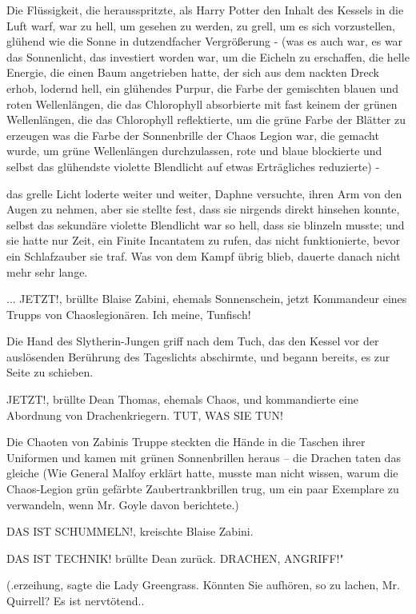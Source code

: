 Die Flüssigkeit, die herausspritzte, als Harry Potter den Inhalt des Kessels in
die Luft warf, war zu hell, um gesehen zu werden, zu grell, um es sich
vorzustellen, glühend wie die Sonne in dutzendfacher Vergrößerung - (was es auch
war, es war das Sonnenlicht, das investiert worden war, um die Eicheln zu
erschaffen, die helle Energie, die einen Baum angetrieben hatte, der sich aus
dem nackten Dreck erhob, lodernd hell, ein glühendes Purpur, die Farbe der
gemischten blauen und roten Wellenlängen, die das Chlorophyll absorbierte mit
fast keinem der grünen Wellenlängen, die das Chlorophyll reflektierte, um die
grüne Farbe der Blätter zu erzeugen was die Farbe der Sonnenbrille der Chaos
Legion war, die gemacht wurde, um grüne Wellenlängen durchzulassen, rote und
blaue blockierte und selbst das glühendste violette Blendlicht auf etwas
Erträgliches reduzierte) -

das grelle Licht loderte weiter und weiter, Daphne versuchte, ihren Arm von den
Augen zu nehmen, aber sie stellte fest, dass sie nirgends direkt hinsehen
konnte, selbst das sekundäre violette Blendlicht war so hell, dass sie blinzeln
musste; und sie hatte nur Zeit, ein Finite Incantatem zu rufen, das nicht
funktionierte, bevor ein Schlafzauber sie traf. Was von dem Kampf übrig blieb,
dauerte danach nicht mehr sehr lange.

... \glqq JETZT!\grqq{}, brüllte Blaise Zabini, ehemals Sonnenschein, jetzt
Kommandeur eines Trupps von Chaoslegionären. \glqq Ich meine, Tunfisch!\grqq{}

Die Hand des Slytherin-Jungen griff nach dem Tuch, das den Kessel vor der
auslösenden Berührung des Tageslichts abschirmte, und begann bereits, es zur
Seite zu schieben.

\glqq JETZT!\grqq{}, brüllte Dean Thomas, ehemals Chaos, und kommandierte eine
Abordnung von Drachenkriegern. \glqq TUT, WAS SIE TUN!\grqq{}

Die Chaoten von Zabinis Truppe steckten die Hände in die Taschen ihrer Uniformen
und kamen mit grünen Sonnenbrillen heraus – die Drachen taten das gleiche (Wie
General Malfoy erklärt hatte, musste man nicht wissen, warum die Chaos-Legion
grün gefärbte Zaubertrankbrillen trug, um ein paar Exemplare zu verwandeln, wenn
Mr. Goyle davon berichtete.)

\glqq DAS IST SCHUMMELN!\grqq{}, kreischte Blaise Zabini.

\glqq DAS IST TECHNIK!\grqq{} brüllte Dean zurück. \glqq DRACHEN, ANGRIFF!"

(\grqq{}.erzeihung\grqq{}, sagte die Lady Greengrass. \glqq Könnten Sie
aufhören, so zu lachen, Mr. Quirrell? Es ist nervtötend.\grqq{}.

